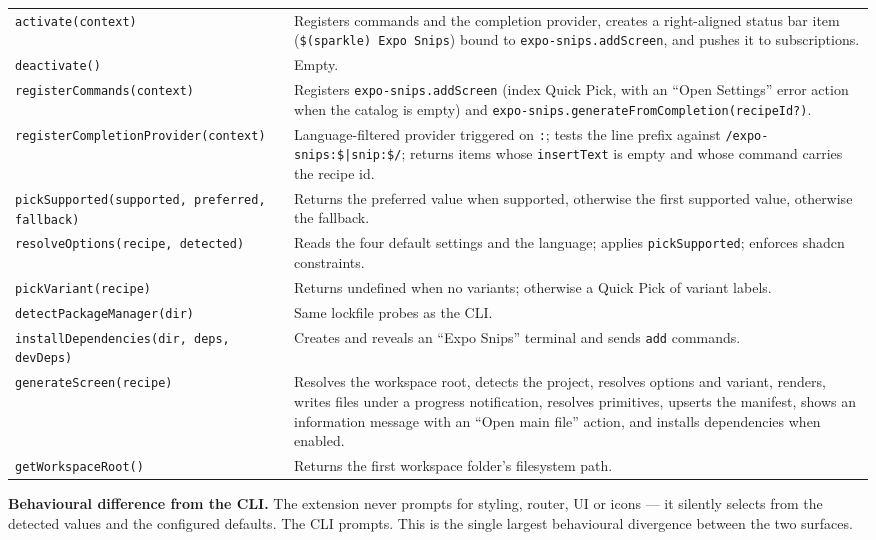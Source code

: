 \begin{longtable}{p{4.2cm}p{9.8cm}}
\texttt{activate(context)} & Registers commands and the completion provider, creates
a right-aligned status bar item (\texttt{\$(sparkle) Expo Snips}) bound to
\texttt{expo-snips.addScreen}, and pushes it to subscriptions. \\
\texttt{deactivate()} & Empty. \\
\texttt{registerCommands(context)} & Registers \texttt{expo-snips.addScreen}
(index Quick Pick, with an ``Open Settings'' error action when the catalog is
empty) and \texttt{expo-snips.generateFromCompletion(recipeId?)}. \\
\texttt{registerCompletionProvider(context)} & Language-filtered provider triggered on
\texttt{:}; tests the line prefix against \texttt{/expo-snips:\$|snip:\$/};
returns items whose \texttt{insertText} is empty and whose command carries the
recipe id. \\
\texttt{pickSupported(supported, preferred, fallback)} & Returns the preferred value
when supported, otherwise the first supported value, otherwise the fallback. \\
\texttt{resolveOptions(recipe, detected)} & Reads the four default settings and the
language; applies \texttt{pickSupported}; enforces shadcn constraints. \\
\texttt{pickVariant(recipe)} & Returns undefined when no variants; otherwise a Quick
Pick of variant labels. \\
\texttt{detectPackageManager(dir)} & Same lockfile probes as the CLI. \\
\texttt{installDependencies(dir, deps, devDeps)} & Creates and reveals an ``Expo
Snips'' terminal and sends \texttt{add} commands. \\
\texttt{generateScreen(recipe)} & Resolves the workspace root, detects the project,
resolves options and variant, renders, writes files under a progress notification,
resolves primitives, upserts the manifest, shows an information message with an
``Open main file'' action, and installs dependencies when enabled. \\
\texttt{getWorkspaceRoot()} & Returns the first workspace folder's filesystem path. \\
\bottomrule
\end{longtable}

\textbf{Behavioural difference from the CLI.} The extension never prompts for
styling, router, UI or icons --- it silently selects from the detected values and
the configured defaults. The CLI prompts. This is the single largest behavioural
divergence between the two surfaces.

